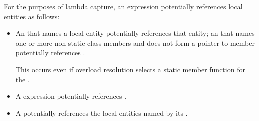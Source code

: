 \pnum
For the purposes of lambda capture,
an expression potentially references local entities as follows:

\begin{itemize}
\item
An  that names a local entity
potentially references that entity;
an  that names
one or more non-static class members
and does not form a pointer to member
potentially references .
\begin{note}
This occurs even if overload resolution
selects a static member function for the .
\end{note}

\item
A  expression potentially references .

\item
A  potentially references
the local entities named by its .
\end{itemize}

